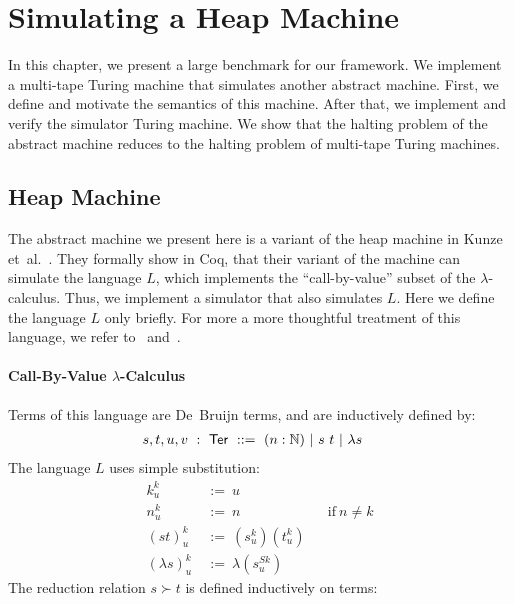 \chapter{Simulating a Heap Machine}
\label{chap:heap}

\newcommand{\subst}[3]{{#1}^{#2}_{#3}}
\newcommand{\Ter}{\MS{Ter}}
\newcommand{\red}{\succ}


In this chapter, we present a large benchmark for our framework.  We implement a multi-tape Turing machine that simulates another abstract machine.
First, we define and motivate the semantics of this machine.  After that, we implement and verify the simulator Turing machine.  We show that the
halting problem of the abstract machine reduces to the halting problem of multi-tape Turing machines.

\section{Heap Machine}
\label{sec:heap}

The abstract machine we present here is a variant of the heap machine in Kunze et~al.~\cite{KunzeEtAl:2018:Formal}.  They formally show in Coq, that
their variant of the machine can simulate the language $L$, which implements the ``call-by-value'' subset of the $\lambda$-calculus.  Thus, we
implement a simulator that also simulates $L$.  Here we define the language $L$ only briefly.  For more a more thoughtful treatment of this language,
we refer to~\cite{forster2017weak} and~\cite{KunzeEtAl:2018:Formal}.


\subsubsection{Call-By-Value $\lambda$-Calculus}
\label{sec:L}

Terms of this language are De~Bruijn terms, and are inductively defined by:
\begin{align*}
  s,t,u,v &~:~\Ter~::=~ (n:\Nat) ~|~ s~t ~|~ \lambda s
\end{align*}
The language $L$ uses simple substitution:
\begin{align*}
  \subst kku &~:=~u \\
  \subst nku &~:=~n &&\text{if}~n\neq k \\
  \subst{(st)}ku &~:=~(\subst sku)(\subst tku) \\
  \subst{(\lambda s)}ku &~:=~\lambda(\subst s{Sk}u)
\end{align*}
The reduction relation $s \red t$ is defined inductively on terms:


